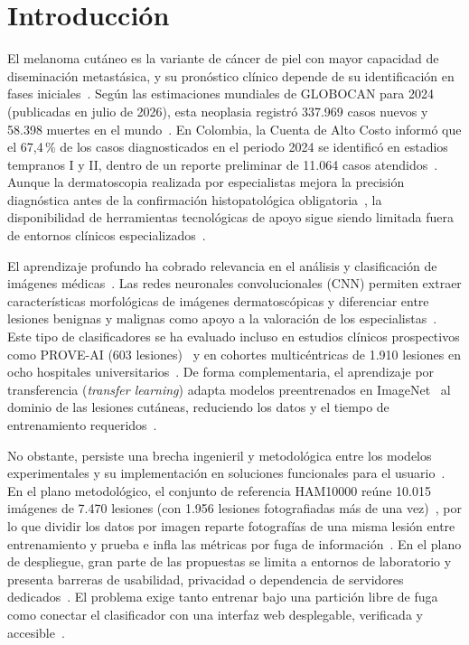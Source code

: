 \chapter{Introducción}

El melanoma cutáneo es la variante de cáncer de piel con mayor capacidad de diseminación metastásica, y su pronóstico clínico depende de su identificación en fases iniciales~\cite{amaral2025esmo}. Según las estimaciones mundiales de GLOBOCAN para 2024 (publicadas en julio de 2026), esta neoplasia registró 337.969 casos nuevos y 58.398 muertes en el mundo~\cite{sung2026globocan,iarc2026melanoma}. En Colombia, la Cuenta de Alto Costo informó que el 67,4\,\% de los casos diagnosticados en el periodo 2024 se identificó en estadios tempranos I y II, dentro de un reporte preliminar de 11.064 casos atendidos~\cite{cac2025melanoma}. Aunque la dermatoscopia realizada por especialistas mejora la precisión diagnóstica antes de la confirmación histopatológica obligatoria~\cite{amaral2025esmo}, la disponibilidad de herramientas tecnológicas de apoyo sigue siendo limitada fuera de entornos clínicos especializados~\cite{un2024sdg}.

El aprendizaje profundo ha cobrado relevancia en el análisis y clasificación de imágenes médicas~\cite{goodfellow2016deep,esteva2017dermatologist}. Las redes neuronales convolucionales (CNN) permiten extraer características morfológicas de imágenes dermatoscópicas y diferenciar entre lesiones benignas y malignas como apoyo a la valoración de los especialistas~\cite{esteva2017dermatologist,sariates2025}. Este tipo de clasificadores se ha evaluado incluso en estudios clínicos prospectivos como PROVE-AI (603 lesiones)~\cite{marchetti2023proveai} y en cohortes multicéntricas de 1.910 lesiones en ocho hospitales universitarios~\cite{heinlein2024multicenter}. De forma complementaria, el aprendizaje por transferencia (\textit{transfer learning}) adapta modelos preentrenados en ImageNet~\cite{deng2009imagenet} al dominio de las lesiones cutáneas, reduciendo los datos y el tiempo de entrenamiento requeridos~\cite{zhang2024dive,cherukuri2025,bello2024densenet}.

No obstante, persiste una brecha ingenieril y metodológica entre los modelos experimentales y su implementación en soluciones funcionales para el usuario~\cite{farias2026,almamun2025}. En el plano metodológico, el conjunto de referencia HAM10000 reúne 10.015 imágenes de 7.470 lesiones (con 1.956 lesiones fotografiadas más de una vez)~\cite{tschandl2018ham10000}, por lo que dividir los datos por imagen reparte fotografías de una misma lesión entre entrenamiento y prueba e infla las métricas por fuga de información~\cite{kapoor2023leakage,abhishek2025quality}. En el plano de despliegue, gran parte de las propuestas se limita a entornos de laboratorio y presenta barreras de usabilidad, privacidad o dependencia de servidores dedicados~\cite{farias2026,ning2024onnxweb}. El problema exige tanto entrenar bajo una partición libre de fuga como conectar el clasificador con una interfaz web desplegable, verificada y accesible~\cite{almamun2025,wang2025browser}.

